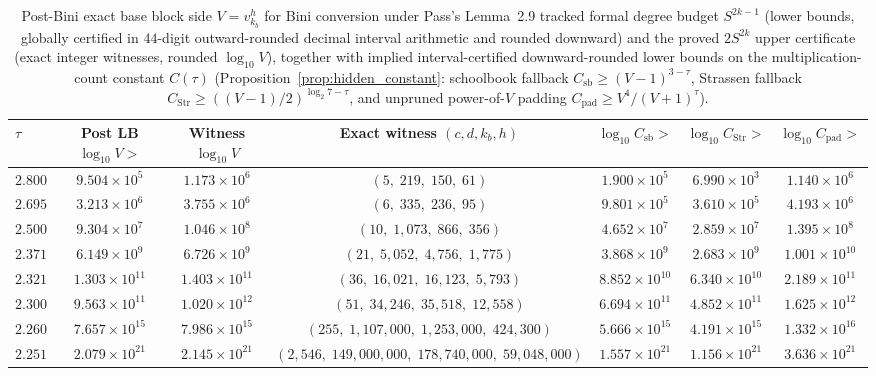 \documentclass[11pt,a4paper]{article}
\theoremstyle{plain}
\theoremstyle{definition}
\theoremstyle{remark}
\begin{document}
\begin{landscape}
\begin{table}[!htbp]
\centering
\footnotesize
\caption{Post-Bini exact base block side $V = v_{k_b}^h$ for Bini conversion under Pass's Lemma~2.9 tracked formal degree budget $S^{2k-1}$ (lower bounds, globally certified in $44$-digit outward-rounded decimal interval arithmetic and rounded downward) and the proved $2 S^{2k}$ upper certificate (exact integer witnesses, rounded $\log_{10} V$), together with implied interval-certified downward-rounded lower bounds on the multiplication-count constant $C(\tau)$ (Proposition~\ref{prop:hidden_constant}: schoolbook fallback $C_{\mathrm{sb}} \ge (V - 1)^{3-\tau}$, Strassen fallback $C_{\mathrm{Str}} \ge ((V - 1)/2)^{\log_2 7 - \tau}$, and unpruned power-of-$V$ padding $C_{\mathrm{pad}} \ge V^4/(V + 1)^\tau$).}
\label{tab:post_bini_bounds}
\begin{tabular}{@{} l c c c c c c @{}}
\toprule
\textbf{$\tau$} & \textbf{Post LB $\log_{10} V >$} & \textbf{Witness $\log_{10} V$} & \textbf{Exact witness $(c, d, k_b, h)$} & \textbf{$\log_{10} C_{\mathrm{sb}} >$} & \textbf{$\log_{10} C_{\mathrm{Str}} >$} & \textbf{$\log_{10} C_{\mathrm{pad}} >$} \\
\midrule
$2.800$ & $9.504 \times 10^{5}$ & $1.173 \times 10^{6}$ & $(5,\; 219,\; 150,\; 61)$ & $1.900 \times 10^{5}$ & $6.990 \times 10^{3}$ & $1.140 \times 10^{6}$ \\
$2.695$ & $3.213 \times 10^{6}$ & $3.755 \times 10^{6}$ & $(6,\; 335,\; 236,\; 95)$ & $9.801 \times 10^{5}$ & $3.610 \times 10^{5}$ & $4.193 \times 10^{6}$ \\
$2.500$ & $9.304 \times 10^{7}$ & $1.046 \times 10^{8}$ & $(10,\; 1{,}073,\; 866,\; 356)$ & $4.652 \times 10^{7}$ & $2.859 \times 10^{7}$ & $1.395 \times 10^{8}$ \\
$2.371$ & $6.149 \times 10^{9}$ & $6.726 \times 10^{9}$ & $(21,\; 5{,}052,\; 4{,}756,\; 1{,}775)$ & $3.868 \times 10^{9}$ & $2.683 \times 10^{9}$ & $1.001 \times 10^{10}$ \\
$2.321$ & $1.303 \times 10^{11}$ & $1.403 \times 10^{11}$ & $(36,\; 16{,}021,\; 16{,}123,\; 5{,}793)$ & $8.852 \times 10^{10}$ & $6.340 \times 10^{10}$ & $2.189 \times 10^{11}$ \\
$2.300$ & $9.563 \times 10^{11}$ & $1.020 \times 10^{12}$ & $(51,\; 34{,}246,\; 35{,}518,\; 12{,}558)$ & $6.694 \times 10^{11}$ & $4.852 \times 10^{11}$ & $1.625 \times 10^{12}$ \\
$2.260$ & $7.657 \times 10^{15}$ & $7.986 \times 10^{15}$ & $(255,\; 1{,}107{,}000,\; 1{,}253{,}000,\; 424{,}300)$ & $5.666 \times 10^{15}$ & $4.191 \times 10^{15}$ & $1.332 \times 10^{16}$ \\
$2.251$ & $2.079 \times 10^{21}$ & $2.145 \times 10^{21}$ & $(2{,}546,\; 149{,}000{,}000,\; 178{,}740{,}000,\; 59{,}048{,}000)$ & $1.557 \times 10^{21}$ & $1.156 \times 10^{21}$ & $3.636 \times 10^{21}$ \\
\bottomrule
\end{tabular}
\end{table}


\end{landscape}
\end{document}
